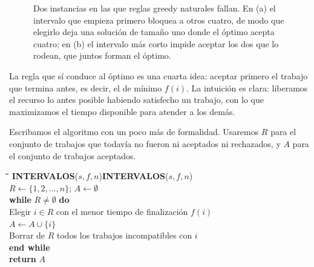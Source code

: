 \documentclass[12pt, spanish, oneside, openany]{book}
\newcommand{\pl}[1]{\makebox[1.6em][r]{\texttt{\footnotesize #1}}\hspace{0.9em}}
\newenvironment{pseudo}[1]{%
  \begin{center}%
  \begin{mdframed}[style=pseudobox]%
  \small
  \begin{tabbing}%
  \hspace{2.5em}\=\hspace{1.5em}\=\hspace{1.5em}\=\hspace{1.5em}\=\hspace{1.5em}\=\kill
  \def\pseudotitulo{#1}\ifx\pseudotitulo\empty\else#1\\[3pt]\fi}%
  {\end{tabbing}\end{mdframed}\end{center}}
\theoremstyle{uprightplain}
\theoremstyle{definition}
\theoremstyle{remark}
\theoremstyle{definition}
\begin{document}
\begin{figure}[H]
\centering
{}
\caption{Dos instancias en las que reglas greedy naturales fallan. En (a) el
intervalo que empieza primero bloquea a otros cuatro, de modo que elegirlo deja
una solución de tamaño uno donde el óptimo acepta cuatro; en (b) el intervalo
más corto impide aceptar los dos que lo rodean, que juntos forman el óptimo.}
\label{fig:greedy-fallan}
\end{figure}

La regla que sí conduce al óptimo es una cuarta idea: aceptar primero el trabajo que termina antes, es decir, el de mínimo $f(i)$. La intuición es clara: liberamos el recurso lo antes posible habiendo satisfecho un trabajo, con lo que maximizamos el tiempo disponible para atender a los demás.

Escribamos el algoritmo con un poco más de formalidad. Usaremos $R$ para el conjunto de trabajos que todavía no fueron ni aceptados ni rechazados, y $A$ para el conjunto de trabajos aceptados.

\begin{pseudo}{\textbf{INTERVALOS}($s,f,n$)}
\pl{1}\> $R \leftarrow \{1,2,\dots,n\}$; \quad $A \leftarrow \emptyset$\\
\pl{2}\> \textbf{while} $R \neq \emptyset$ \textbf{do}\\
\pl{3}\>\> Elegir $i \in R$ con el menor tiempo de finalización $f(i)$\\
\pl{4}\>\> $A \leftarrow A \cup \{i\}$\\
\pl{5}\>\> Borrar de $R$ todos los trabajos incompatibles con $i$\\
\pl{6}\> \textbf{end while}\\
\pl{7}\> \textbf{return} $A$
\end{pseudo}
\end{document}

